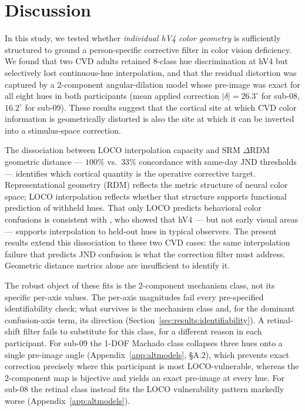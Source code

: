 
\section{Discussion}
\label{sec:discussion}

In this study, we tested whether \emph{individual hV4 color geometry} is sufficiently structured to ground a person-specific corrective filter in color vision deficiency.
We found that two CVD adults retained 8-class hue discrimination at hV4 but selectively lost continuous-hue interpolation, and that the residual distortion was captured by a 2-component angular-dilation model whose pre-image was exact for all eight hues in both participants (mean applied correction $|\delta| = 26.3^\circ$ for sub-08, $16.2^\circ$ for sub-09).
These results suggest that the cortical site at which CVD color information is geometrically distorted is also the site at which it can be inverted into a stimulus-space correction.

The dissociation between LOCO interpolation capacity and SRM $\Delta$RDM geometric distance --- $100\%$ vs.\ $33\%$ concordance with same-day JND thresholds --- identifies which cortical quantity is the operative corrective target.
Representational geometry (RDM) reflects the metric structure of neural color space; LOCO interpolation reflects whether that structure supports functional prediction of withheld hues.
That only LOCO predicts behavioral color confusions is consistent with , who showed that hV4 --- but not early visual areas --- supports interpolation to held-out hues in typical observers.
The present results extend this dissociation to these two CVD cases: the same interpolation failure that predicts JND confusion is what the correction filter must address.
Geometric distance metrics alone are insufficient to identify it.

The robust object of these fits is the 2-component mechanism class, not its specific per-axis values.
The per-axis magnitudes fail every pre-specified identifiability check; what survives is the mechanism class and, for the dominant confusion-axis term, its direction (Section~\ref{sec:results:identifiability}).
A retinal-shift filter fails to substitute for this class, for a different reason in each participant.
For sub-09 the 1-DOF Machado class collapses three hues onto a single pre-image angle (Appendix~\ref{app:altmodels}, §A.2), which prevents exact correction precisely where this participant is most LOCO-vulnerable, whereas the 2-component map is bijective and yields an exact pre-image at every hue.
For sub-08 the retinal class instead fits the LOCO vulnerability pattern markedly worse (Appendix~\ref{app:altmodels}).

